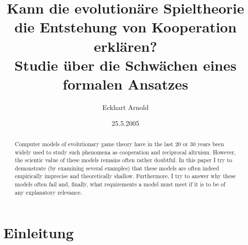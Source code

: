 \documentclass[12pt,a4paper,ngerman]{article}
\begin{document}
\selectlanguage{\ngerman}

\title{Kann die evolutionäre Spieltheorie die Entstehung von Kooperation erklären?\\Studie über die Schwächen eines formalen Ansatzes}
\author{Eckhart Arnold}
\date{25.5.2005}
\maketitle
\begin{abstract}

  Computer models of evolutionary game theory have in the last 20 or
  30 years been widely used to study such phenomena as cooperation and
  reciprocal altruism. However, the scientic value of these models
  remains often rather doubtful. In this paper I try to demonstrate
  (by examining several examples) that these models are often indeed
  empirically imprecise and theoretically shallow. Furthermore, I try
  to answer why these models often fail and, finally, what
  requirements a model must meet if it is to be of any explanatory
  relevance.

\end{abstract}

\newpage

\tableofcontents

\newpage

\setcounter{page}{1}

\section{Einleitung}
\end{document}
